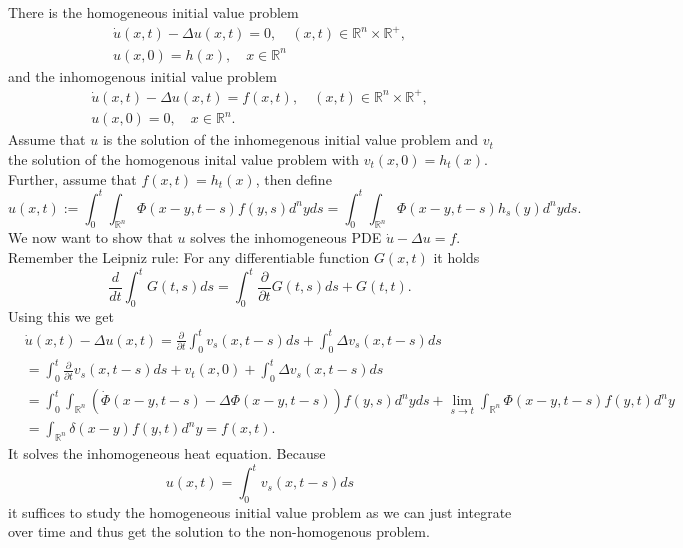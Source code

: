 \documentclass[A4,12pt,twoside]{book}
\begin{document}
There is the homogeneous initial value problem 
\begin{align*}
    \dot{u} (x,t) - \Delta u(x,t) =0, \quad (x,t) \in \mathbb{R}^n \times \mathbb{R}^+,\\
    u(x,0) = h(x), \quad x \in \mathbb{R}^n
\end{align*}
and the inhomogenous initial value problem 
\begin{align*}
    \dot{u} (x,t) - \Delta u(x,t) =f(x,t), \quad (x,t) \in \mathbb{R}^n \times \mathbb{R}^+,\\
    u(x,0) = 0, \quad x \in \mathbb{R}^n.
\end{align*}
Assume that $u$ is the solution of the inhomegenous initial value problem and $v_t$ the solution of the homogenous inital value problem with $v_t (x,0)=h_t(x)$. Further, assume that $f(x,t)=h_t (x)$, then define
\[
u(x,t):= \int_0^t \int_{\mathbb{R}^n} \Phi (x-y,t-s) f(y,s) d^n y ds =  \int_0^t \int_{\mathbb{R}^n} \Phi (x-y,t-s) h_s (y ) d^n y ds .
\]
We now want to show that $u$ solves the inhomogeneous PDE $\dot{u}-\Delta u =f$. Remember the Leipniz rule: For any differentiable function $G(x,t)$ it holds 
\[
\frac{d}{dt} \int_0^t G(t,s) ds = \int_0^t \frac{\partial}{\partial t} G(t,s) ds + G(t,t).
\]
Using this we get 
\begin{align*}
&\dot{u}(x,t) - \Delta u(x,t)= \frac{\partial}{\partial t} \int_0^t v_s (x,t-s) ds + \int_0^t \Delta v_s (x,t-s) ds \\
&=  \int_0^t\frac{\partial}{\partial t} v_s (x,t-s) ds + v_t(x,0) + \int_0^t \Delta v_s (x,t-s) ds \\
&= \int_0^t \int_{\mathbb{R}^n} \left(\dot{\Phi} (x-y,t-s) - \Delta \Phi (x-y,t-s) \right) f(y,s) d^n y ds +\lim_{s \to t} \int_{\mathbb{R}^n} \Phi (x-y,t-s)  f(y,t) d^n y\\
&= \int_{\mathbb{R}^n} \delta (x-y)  f(y,t) d^n y=f(x,t).
\end{align*}
It solves the inhomogeneous heat equation. Because 
\[
u(x,t)=\int_0^t v_s(x,t-s)   ds 
\]
it suffices to study the homogeneous initial value problem as we can just integrate over time and thus get the solution to the non-homogenous problem.
\end{document}
